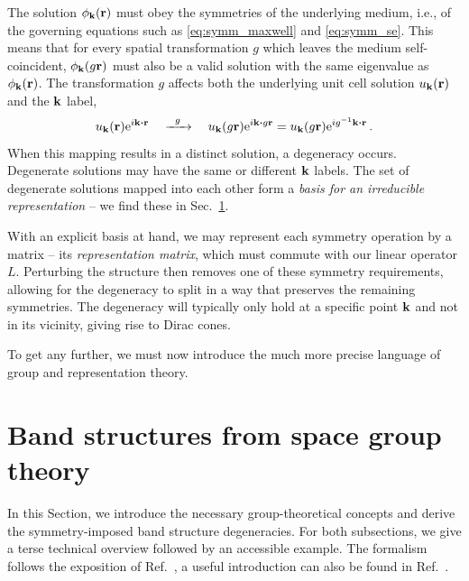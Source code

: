 The solution $\phi_{\vb{k}}(\vb{r})$ must obey the symmetries of the underlying medium, i.e., of the governing equations such as \eqref{eq:symm_maxwell} and \eqref{eq:symm_se}. This means that for every spatial transformation $g$ which leaves the medium self-coincident, $\phi_{\vb{k}}(g \vb{r})$ must also be a valid solution with the same eigenvalue as $\phi_{\vb{k}}(\vb{r})$. The transformation $g$ affects both the underlying unit cell solution $u_{\vb{k}}(\vb{r})$ and the $\vb{k}$ label,
\begin{equation}
u_{\vb{k}}(\vb{r}) \e^{i \vb{k} \vdot \vb{r}}\quad \xrightarrow{\mathmakebox[1.5em]{g}} \quad u_{\vb{k}}(g \vb{r}) \e^{i \vb{k} \vdot g \vb{r}} = u_{\vb{k}}(g \vb{r}) \e^{i g^{-1} \vb{k} \vdot \vb{r}} \,.
\end{equation}
When this mapping results in a distinct solution, a degeneracy occurs. Degenerate solutions may have the same or different $\vb{k}$ labels. The set of degenerate solutions mapped into each other form a \textit{basis for an irreducible representation} -- we find these in Sec.~\ref{sec:symm_groups}.

With an explicit basis at hand, we may represent each symmetry operation by a matrix -- its \textit{representation matrix}, which must commute with our linear operator $L$. Perturbing the structure then removes one of these symmetry requirements, allowing for the degeneracy to split in a way that preserves the remaining symmetries. The degeneracy will typically only hold at a specific point $\vb{k}$ and not in its vicinity, giving rise to Dirac cones.

To get any further, we must now introduce the much more precise language of group and representation theory.

\section{Band structures from space group theory} \label{sec:symm_groups}

In this Section, we introduce the necessary group-theoretical concepts and derive the symmetry-imposed band structure degeneracies. For both subsections, we give a terse technical overview followed by an accessible example. The formalism follows the exposition of Ref.~\cite{Bradley_2009}, a useful introduction can also be found in Ref.~\cite{Cano_2018}. 

